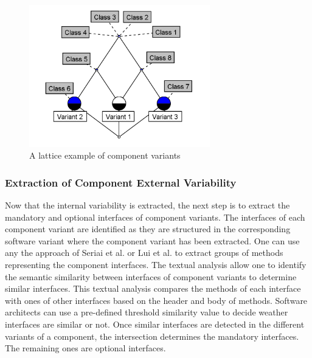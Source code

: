 \documentclass[graybox]{svmult}
\begin{document}
\begin{table}[h]
 \centering
 \caption{An example of formal context of three component variants}
\end{table}

\begin{figure}[h]
\centering
\includegraphics[width=0.7\textwidth]{figs/component_variant_lattice.png}
\caption{A lattice example of component variants}
\label{fig:lattComVar}
\end{figure}

\subsubsection{Extraction of Component External Variability}
Now that the internal variability is extracted, the next step is to  extract the mandatory and optional interfaces of component variants. The interfaces of each component variant are identified as they are structured in the corresponding software variant where the component variant has been extracted. One can use any the approach of Seriai et al. \cite{seriai2014deriving} or Lui et al. \cite{liu2018component} to extract groups of methods representing the component interfaces. 
The textual analysis allow one to identify the semantic similarity between interfaces of component variants to determine similar interfaces. This textual analysis compares the methods of each interface with ones of other interfaces based on the header and body of methods. Software architects can use a pre-defined threshold similarity value to decide weather interfaces are similar or not. Once similar interfaces are detected in the different variants of a component, the intersection determines the mandatory interfaces. The remaining ones are optional interfaces.  
\end{document}
